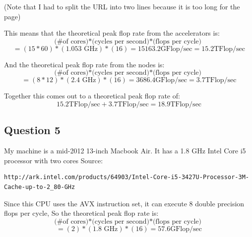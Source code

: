 \documentclass[11pt]{article}
\begin{document}
(Note that I had to split the URL into two lines because it is too long for the page)



This means that the theoretical peak flop rate from the accelerators is:
$$
\mbox{(\# of cores)*(cycles per second)*(flops per cycle) } 
$$
$$
= (15*60)*(1.053 \mbox{ GHz})*(16) = 15163.2 \mbox{GFlop/sec} = 15.2 \mbox{TFlop/sec}
$$

And the theoretical peak flop rate from the nodes is:
$$
\mbox{(\# of cores)*(cycles per second)*(flops per cycle) } 
$$
$$
= (8*12)*(2.4 \mbox{ GHz})*(16) = 3686.4 \mbox{GFlop/sec} = 3.7 \mbox{TFlop/sec}
$$

Together this comes out to a theoretical peak flop rate of:
$$15.2 \mbox{TFlop/sec} + 3.7 \mbox{TFlop/sec} = 18.9 \mbox{TFlop/sec} $$

\subsection*{Question 5}

My machine is a mid-2012 13-inch Macbook Air. It has a 1.8 GHz Intel Core i5 processor with two cores
Source: 
\begin{verbatim}
http://ark.intel.com/products/64903/Intel-Core-i5-3427U-Processor-3M-Cache-up-to-2_80-GHz
\end{verbatim}

Since this CPU uses the AVX instruction set, it can execute 8 double precision flops per cycle,
So the theoretical peak flop rate is:
$$
\mbox{(\# of cores)*(cycles per second)*(flops per cycle) }
$$
$$
= (2)*(1.8 \mbox{ GHz})*(16) = 57.6 \mbox{GFlop/sec}
$$
\end{document}
